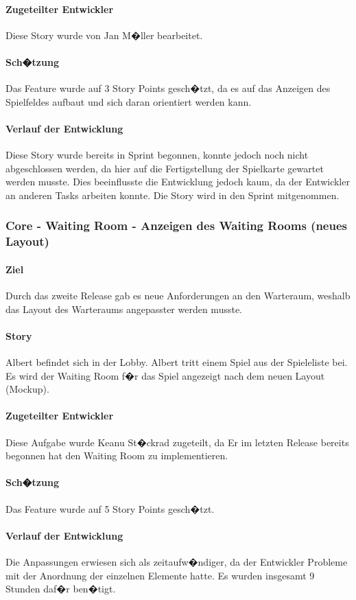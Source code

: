 \documentclass[12pt, titlepage]{scrartcl}
\newcommand{\RN}[1]{%
	\textup{\uppercase\expandafter{\romannumeral#1}}%
}
\begin{document}
		\paragraph{Zugeteilter Entwickler} Diese Story wurde von Jan M�ller bearbeitet.
		\paragraph{Sch�tzung}
		Das Feature wurde auf 3 Story Points gesch�tzt, da es auf das Anzeigen des Spielfeldes aufbaut und sich daran orientiert werden kann.
		\paragraph{Verlauf der Entwicklung} 
		Diese Story wurde bereits in Sprint \RN{3} begonnen, konnte jedoch noch nicht abgeschlossen werden, da hier auf die Fertigstellung der Spielkarte gewartet werden musste. Dies beeinflusste die Entwicklung jedoch kaum, da der Entwickler an anderen Tasks arbeiten konnte. Die Story wird in den Sprint \RN{4} mitgenommen.
		
		\subsubsection{Core - Waiting Room - Anzeigen des Waiting Rooms (neues Layout)}
		\paragraph{Ziel} Durch das zweite Release gab es neue Anforderungen an den Warteraum, weshalb das Layout des Warteraums angepasster werden musste.
		\paragraph{Story} Albert befindet sich in der Lobby. Albert tritt einem Spiel aus der Spieleliste bei. Es wird der Waiting Room f�r das Spiel angezeigt nach dem neuen Layout (Mockup).
		\paragraph{Zugeteilter Entwickler} Diese Aufgabe wurde Keanu St�ckrad zugeteilt, da Er im letzten Release bereits begonnen hat den Waiting Room zu implementieren.
		\paragraph{Sch�tzung}
		Das Feature wurde auf 5 Story Points gesch�tzt.
		\paragraph{Verlauf der Entwicklung} 
		Die Anpassungen erwiesen sich als zeitaufw�ndiger, da der Entwickler Probleme mit der Anordnung der einzelnen Elemente hatte. Es wurden insgesamt 9 Stunden daf�r ben�tigt.
		
\end{document}
